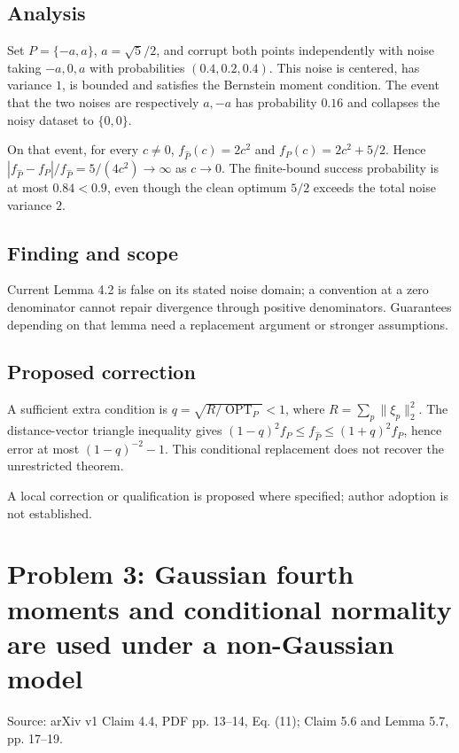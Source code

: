 \documentclass[11pt]{article}
\begin{document}
\subsection*{Analysis}

Set \(P=\{-a,a\}\), \(a=\sqrt5/2\), and corrupt both points independently with noise taking \(-a,0,a\) with probabilities \((0.4,0.2,0.4)\). This noise is centered, has variance \(1\), is bounded and satisfies the Bernstein moment condition. The event that the two noises are respectively \(a,-a\) has probability \(0.16\) and collapses the noisy dataset to \(\{0,0\}\).

On that event, for every \(c\ne0\), \(f_{\widehat P}(c)=2c^2\) and \(f_P(c)=2c^2+5/2\). Hence \(|f_{\widehat P}-f_P|/f_{\widehat P}=5/(4c^2)\to\infty\) as \(c\to0\). The finite-bound success probability is at most \(0.84<0.9\), even though the clean optimum \(5/2\) exceeds the total noise variance \(2\).

\subsection*{Finding and scope}

Current Lemma 4.2 is false on its stated noise domain; a convention at a zero denominator cannot repair divergence through positive denominators. Guarantees depending on that lemma need a replacement argument or stronger assumptions.

\subsection*{Proposed correction}

A sufficient extra condition is \(q=\sqrt{R/\operatorname{OPT}_P}<1\), where \(R=\sum_p\|\xi_p\|_2^2\). The distance-vector triangle inequality gives \((1-q)^2f_P\le f_{\widehat P}\le(1+q)^2f_P\), hence error at most \((1-q)^{-2}-1\). This conditional replacement does not recover the unrestricted theorem.

A local correction or qualification is proposed where specified; author adoption is not established.

\section*{Problem 3: Gaussian fourth moments and conditional normality are used under a non-Gaussian model}

Source: arXiv v1 Claim 4.4, PDF pp. 13–14, Eq. (11); Claim 5.6 and Lemma 5.7, pp. 17–19.
\end{document}
